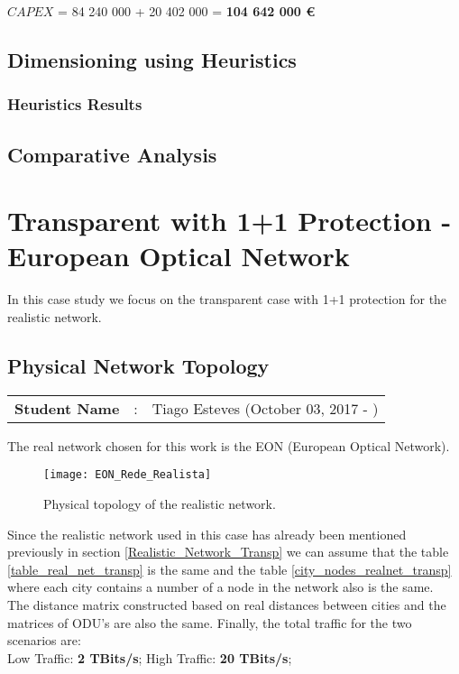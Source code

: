 $CAPEX$ = 84 240 000 + 20 402 000 = \textbf{104 642 000 \euro}\\


\subsection{Dimensioning using Heuristics}

\subsubsection{Heuristics Results}

\subsection{Comparative Analysis}


\newpage
\section{Transparent with 1+1 Protection - European Optical Network}

In this case study we focus on the transparent case with 1+1 protection for the realistic network.

\subsection{Physical Network Topology}
\begin{tcolorbox}	
\begin{tabular}{p{2.75cm} p{0.2cm} p{10.5cm}} 	
\textbf{Student Name}  &:& Tiago Esteves    (October 03, 2017 - )\\
\end{tabular}
\end{tcolorbox}

The real network chosen for this work is the EON (European Optical Network).

\begin{figure}[h!]
\centering
\texttt{[image: EON\_Rede\_Realista]}
\caption{Physical topology of the realistic network.}
\end{figure}

Since the realistic network used in this case has already been mentioned previously in section \ref{Realistic_Network_Transp} we can assume that the table \ref{table_real_net_transp} is the same and the table \ref{city_nodes_realnet_transp} where each city contains a number of a node in the network also is the same.\\
The distance matrix constructed based on real distances between cities and the matrices of ODU's are also the same.
Finally, the total traffic for the two scenarios are:\\
Low Traffic: \textbf{2 TBits/s}; \quad High Traffic: \textbf{20 TBits/s};\\

